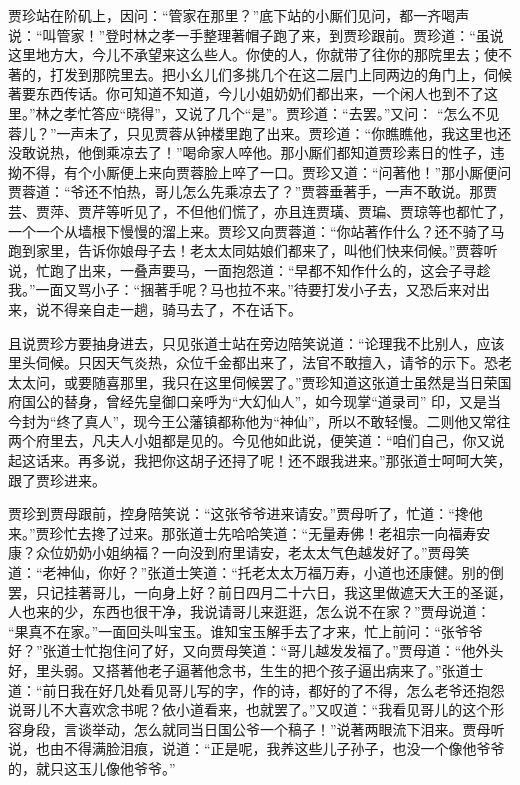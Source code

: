 \begin{parag}
    贾珍站在阶矶上，因问：“管家在那里？”底下站的小厮们见问，都一齐喝声说：“叫管家！”登时林之孝一手整理著帽子跑了来，到贾珍跟前。贾珍道：“虽说这里地方大，今儿不承望来这么些人。你使的人，你就带了往你的那院里去；使不著的，打发到那院里去。把小幺儿们多挑几个在这二层门上同两边的角门上，伺候著要东西传话。你可知道不知道，今儿小姐奶奶们都出来，一个闲人也到不了这里。”林之孝忙答应“晓得”，又说了几个“是”。贾珍道：“去罢。”又问： “怎么不见蓉儿？”一声未了，只见贾蓉从钟楼里跑了出来。贾珍道：“你瞧瞧他，我这里也还没敢说热，他倒乘凉去了！”喝命家人啐他。那小厮们都知道贾珍素日的性子，违拗不得，有个小厮便上来向贾蓉脸上啐了一口。贾珍又道：“问著他！”那小厮便问贾蓉道：“爷还不怕热，哥儿怎么先乘凉去了？”贾蓉垂著手，一声不敢说。那贾芸、贾萍、贾芹等听见了，不但他们慌了，亦且连贾璜、贾㻞、贾琼等也都忙了，一个一个从墙根下慢慢的溜上来。贾珍又向贾蓉道：“你站著作什么？还不骑了马跑到家里，告诉你娘母子去！老太太同姑娘们都来了，叫他们快来伺候。”贾蓉听说，忙跑了出来，一叠声要马，一面抱怨道：“早都不知作什么的，这会子寻趁我。”一面又骂小子：“捆著手呢？马也拉不来。”待要打发小子去，又恐后来对出来，说不得亲自走一趟，骑马去了，不在话下。
\end{parag}


\begin{parag}
    且说贾珍方要抽身进去，只见张道士站在旁边陪笑说道：“论理我不比别人，应该里头伺候。只因天气炎热，众位千金都出来了，法官不敢擅入，请爷的示下。恐老太太问，或要随喜那里，我只在这里伺候罢了。”贾珍知道这张道士虽然是当日荣国府国公的替身，曾经先皇御口亲呼为“大幻仙人”，如今现掌“道录司” 印，又是当今封为“终了真人”，现今王公藩镇都称他为“神仙”，所以不敢轻慢。二则他又常往两个府里去，凡夫人小姐都是见的。今见他如此说，便笑道：“咱们自己，你又说起这话来。再多说，我把你这胡子还挦了呢！还不跟我进来。”那张道士呵呵大笑，跟了贾珍进来。
\end{parag}


\begin{parag}
    贾珍到贾母跟前，控身陪笑说：“这张爷爷进来请安。”贾母听了，忙道：“搀他来。”贾珍忙去搀了过来。那张道士先哈哈笑道：“无量寿佛！老祖宗一向福寿安康？众位奶奶小姐纳福？一向没到府里请安，老太太气色越发好了。”贾母笑道：“老神仙，你好？”张道士笑道：“托老太太万福万寿，小道也还康健。别的倒罢，只记挂著哥儿，一向身上好？前日四月二十六日，我这里做遮天大王的圣诞，人也来的少，东西也很干净，我说请哥儿来逛逛，怎么说不在家？”贾母说道： “果真不在家。”一面回头叫宝玉。谁知宝玉解手去了才来，忙上前问：“张爷爷好？”张道士忙抱住问了好，又向贾母笑道：“哥儿越发发福了。”贾母道：“他外头好，里头弱。又搭著他老子逼著他念书，生生的把个孩子逼出病来了。”张道士道：“前日我在好几处看见哥儿写的字，作的诗，都好的了不得，怎么老爷还抱怨说哥儿不大喜欢念书呢？依小道看来，也就罢了。”又叹道：“我看见哥儿的这个形容身段，言谈举动，怎么就同当日国公爷一个稿子！”说著两眼流下泪来。贾母听说，也由不得满脸泪痕，说道：“正是呢，我养这些儿子孙子，也没一个像他爷爷的，就只这玉儿像他爷爷。”
\end{parag}



